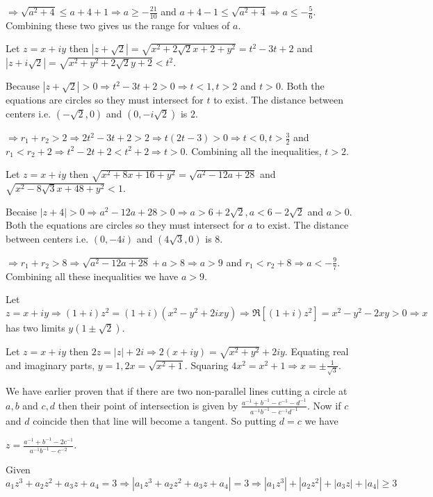   $\Rightarrow \sqrt{a^2 + 4} \leq a + 4 + 1 \Rightarrow a \geq -\frac{21}{10}$ and $a + 4 - 1\leq \sqrt{a^2
    + 4} \Rightarrow a\leq -\frac{5}{6}$. Combining these two gives us the range for values of $a$.
\item Let $z = x + iy$ then $|z + \sqrt{2}| = \sqrt{x^2 + 2\sqrt{2}x + 2 + y^2} = t^2 - 3t + 2$ and $|z +
  i\sqrt{2}| = \sqrt{x^2 + y^2 + 2\sqrt{2}y + 2} < t^2$.

  Because $|z + \sqrt{2}| > 0 \Rightarrow t^2 - 3t + 2 > 0 \Rightarrow t < 1, t > 2$ and $t > 0$. Both the
  equations are circles so they must intersect for $t$ to exist. The distance between centers
  i.e. $(-\sqrt{2}, 0)$ and $(0, -i\sqrt{2})$ is $2$.

  $\Rightarrow r_1 + r_2 > 2 \Rightarrow 2t^2 - 3t + 2 > 2 \Rightarrow t(2t - 3) > 0 \Rightarrow t < 0, t >
  \frac{3}{2}$ and $r_1 < r_2 + 2 \Rightarrow t^2 - 2t + 2 < t^2 + 2 \Rightarrow t  > 0$. Combining all the
  inequalities, $t > 2$.
\item Let $z = x + iy$ then $\sqrt{x^2 + 8x + 16 + y^2} = \sqrt{a^2 - 12a + 28}$ and $\sqrt{x^2 - 8\sqrt{3}x
  + 48 + y^2} < 1$.

  Becaise $|z + 4| > 0 \Rightarrow a^2 - 12a + 28 > 0 \Rightarrow a > 6 + 2\sqrt{2}, a < 6 - 2\sqrt{2}$ and
  $a > 0$. Both the equations are  circles so they must intersect for $a$ to exist. The distance between
  centers i.e. $(0, -4i)$ and $(4\sqrt{3}, 0)$ is $8$.

  $\Rightarrow r_1 + r_2 > 8 \Rightarrow \sqrt{a^2 - 12a + 28} + a > 8 \Rightarrow a > 9$ and $r_1 < r_2 + 8
  \Rightarrow a < -\frac{9}{7}$. Combining all these inequalities we have $a > 9$.
\item Let $z = x + iy \Rightarrow (1 + i)z^2 = (1 + i)(x^2 - y^2 + 2ixy)\Rightarrow \Re[(1 + i)z^2] = x^2 -
  y^2 - 2xy > 0 \Rightarrow x$ has two limits $y(1 \pm\sqrt{2})$.
\item Let $z = x + iy$ then $2z = |z| + 2i \Rightarrow 2(x + iy) = \sqrt{x^2 + y^2} + 2iy$. Equating real
  and imaginary parts, $y = 1, 2x = \sqrt{x^2 + 1}$. Squaring $4x^2 = x^2 + 1 \Rightarrow x =
  \pm\frac{1}{\sqrt{3}}$.
\item We have earlier proven that if there are two non-parallel lines cutting a circle at $a, b$ and $c, d$
  then their point of intersection is given by $\frac{a^{-1} + b^{-1} - c^{-1} - d^{-1}}{a^{-1}b^{-1}-
    c^{-1}d^{-1}}$. Now if $c$ and $d$ coincide then that line will become a tangent. So putting $d = c$ we
  have

  $z = \frac{a^{-1} + b^{-1} - 2c^{-1}}{a^{-1}b^{-1} - c^{-2}}$.
\item Given $a_1z^3 + a_2z^2 + a_3z + a_4 = 3 \Rightarrow |a_1z^3 + a_2z^2 + a_3z + a_4| = 3 \Rightarrow
  |a_1z^3| + |a_2z^2| + |a_3z| + |a_4| \geq 3$

